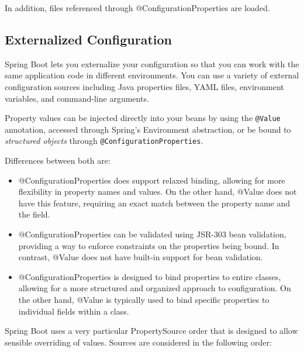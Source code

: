 \documentclass{scrartcl}
\begin{document}
In addition, files referenced through @ConfigurationProperties are loaded.

\subsection{Externalized Configuration}

Spring Boot lets you externalize your configuration so that you can work with the same application code in different environments. You can use a variety of external configuration sources including Java properties files, YAML files, environment variables, and command-line arguments.

Property values can be injected directly into your beans by using the \lstinline |@Value| annotation, accessed through Spring’s Environment abstraction, or be bound to \textit{structured objects} through \lstinline[]|@ConfigurationProperties|.

Differences between both are:

\begin{itemize}
    \item @ConfigurationProperties does support relaxed binding, allowing for more flexibility in property names and values. On the other hand, @Value does not have this feature, requiring an exact match between the property name and the field.
    \item @ConfigurationProperties can be validated using JSR-303 bean validation, providing a way to enforce constraints on the properties being bound. In contrast, @Value does not have built-in support for bean validation.
    \item @ConfigurationProperties is designed to bind properties to entire classes, allowing for a more structured and organized approach to configuration. On the other hand, @Value is typically used to bind specific properties to individual fields within a class.
\end{itemize}

Spring Boot uses a very particular PropertySource order that is designed to allow sensible overriding of values. Sources are considered in the following order:
\end{document}
